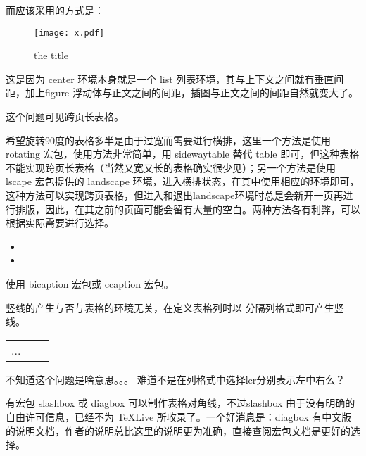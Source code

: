 而应该采用的方式是：

\begin{texinlist}
\begin{figure}
\centering
\texttt{[image: x.pdf]}
\caption{the title}
\end{figure}
\end{texinlist}

这是因为 center 环境本身就是一个 list
列表环境，其与上下文之间就有垂直间距，加上figure
浮动体与正文之间的间距，插图与正文之间的间距自然就变大了。



这个问题可见跨页长表格。



希望旋转90度的表格多半是由于过宽而需要进行横排，这里一个方法是使用
rotating 宏包，使用方法非常简单，用 sidewaytable 替代 table
即可，但这种表格不能实现跨页长表格（当然又宽又长的表格确实很少见）；另一个方法是使用lscape
宏包提供的 landscape
环境，进入横排状态，在其中使用相应的环境即可，这种方法可以实现跨页表格，但进入和退出landscape环境时总是会新开一页再进行排版，因此，在其之前的页面可能会留有大量的空白。两种方法各有利弊，可以根据实际需要进行选择。



\begin{itemize}
  \item {}
  \item {}
\end{itemize}



使用 bicaption 宏包或 ccaption 宏包。



竖线的产生与否与表格的环境无关，在定义表格列时以 \textbar{}
分隔列格式即可产生竖线。
\begin{texinlist}
\begin{tabular}{l|c|r|}
  ...
\end{tabular}
\end{texinlist}







不知道这个问题是啥意思。。。
难道不是在列格式中选择lcr分别表示左中右么？


有宏包 slashbox 或 diagbox 可以制作表格对角线，不过slashbox
由于没有明确的自由许可信息，已经不为 TeXLive
所收录了。一个好消息是：diagbox
有中文版的说明文档，作者的说明总比这里的说明更为准确，直接查阅宏包文档是更好的选择。
